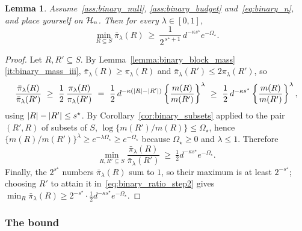 \documentclass[aos]{imsart}%
\DeclarePairedDelimiter{\abs}{\lvert}{\rvert}
\theoremstyle{plain}
\newtheorem{lemma}[theorem]{Lemma}
\theoremstyle{definition}
\begin{document}
    \begin{lemma}
        \label{lemma:binary_ratio}
        Assume~\ref{ass:binary_null}, \ref{ass:binary_budget}
        and~\eqref{eq:binary_n}, and place yourself on
        $\mathcal{H}_n$. Then for every $\lambda\in[0,1]$,
        \begin{equation}
            \label{eq:binary_ratio}
            \min_{R\subseteq S}\bar\pi_\lambda(R)\ \geq\
            \frac{1}{2^{\,s^{\star}+1}}\,d^{-\kappa s^{\star}}
            e^{-\Omega_\star} .
        \end{equation}
    \end{lemma}

    \begin{proof}
        Let $R,R'\subseteq S$. By
        Lemma~\ref{lemma:binary_block_mass}\ref{it:binary_mass_iii},
        $\bar\pi_\lambda(R)\geq\pi_\lambda(R)$ and
        $\bar\pi_\lambda(R')\leq2\pi_\lambda(R')$, so
        \begin{equation}
            \label{eq:binary_ratio_step1}
            \frac{\bar\pi_\lambda(R)}{\bar\pi_\lambda(R')}
            \ \geq\ \frac12\,\frac{\pi_\lambda(R)}{\pi_\lambda(R')}
            \ =\ \frac12\,d^{-\kappa(\abs R-\abs{R'})}
            \left\{\frac{m(R)}{m(R')}\right\}^{\lambda}
            \ \geq\ \frac12\,d^{-\kappa s^{\star}}
            \left\{\frac{m(R)}{m(R')}\right\}^{\lambda},
        \end{equation}
        using $\abs R-\abs{R'}\leq s^{\star}$. By
        Corollary~\ref{cor:binary_subsets} applied to the pair $(R',R)$ of
        subsets of $S$, $\log\{m(R')/m(R)\}\leq\Omega_\star$, hence
        $\{m(R)/m(R')\}^{\lambda}\geq e^{-\lambda\Omega_\star}
        \geq e^{-\Omega_\star}$ because $\Omega_\star\geq0$ and
        $\lambda\leq1$. Therefore
        \begin{equation}
            \label{eq:binary_ratio_step2}
            \min_{R,R'\subseteq S}
            \frac{\bar\pi_\lambda(R)}{\bar\pi_\lambda(R')}
            \ \geq\ \tfrac12 d^{-\kappa s^{\star}}e^{-\Omega_\star} .
        \end{equation}
        Finally, the $2^{s^{\star}}$ numbers $\bar\pi_\lambda(R)$ sum to $1$,
        so their maximum is at least $2^{-s^{\star}}$; choosing $R'$ to attain
        it in~\eqref{eq:binary_ratio_step2} gives
        $\min_R\bar\pi_\lambda(R)\geq2^{-s^{\star}}
        \cdot\tfrac12d^{-\kappa s^{\star}}e^{-\Omega_\star}$.
    \end{proof}

    \subsubsection{The bound}
\end{document}
